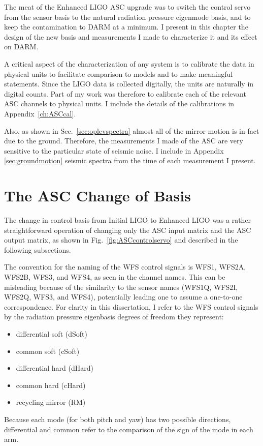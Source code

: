 The meat of the Enhanced LIGO ASC upgrade was to switch the control
servo from the sensor basis to the natural radiation pressure
eigenmode basis, and to keep the contamination to DARM at a minimum. I
present in this chapter the design of the new basis and measurements I
made to characterize it and its effect on DARM.

A critical aspect of the characterization of any system is to
calibrate the data in physical units to facilitate comparison to
models and to make meaningful statements. Since the LIGO data is
collected digitally, the units are naturally in digital counts. Part
of my work was therefore to calibrate each of the relevant ASC
channels to physical units. I include the details of the calibrations
in Appendix~\ref{ch:ASCcal}.

Also, as shown in Sec.~\ref{sec:oplevspectra} almost all of the mirror
motion is in fact due to the ground. Therefore, the measurements I
made of the ASC are very sensitive to the particular state of seismic
noise. I include in Appendix \ref{sec:groundmotion} seismic spectra
from the time of each measurement I present.




\section{The ASC Change of Basis}
The change in control basis from Initial LIGO to Enhanced LIGO was a
rather straightforward operation of changing only the ASC input matrix
and the ASC output matrix, as shown in Fig.~\ref{fig:ASCcontrolservo} and
described in the following subsections.

The convention for the naming of the WFS control signals is WFS1,
WFS2A, WFS2B, WFS3, and WFS4, as seen in the channel names. This can
be misleading because of the similarity to the sensor names (WFS1Q,
WFS2I, WFS2Q, WFS3, and WFS4), potentially leading one to assume a
one-to-one correspondence. For clarity in this dissertation, I refer
to the WFS control signals by the radiation pressure eigenbasis
degrees of freedom they represent: 
\begin{itemize}
\item differential soft (dSoft) \\
\item common soft (cSoft) \\
\item differential hard (dHard) \\
\item common hard (cHard) \\
\item recycling mirror (RM)
\end{itemize}
Because each mode (for both pitch and yaw) has two possible
directions, differential and common refer to the comparison of the
sign of the mode in each arm.

